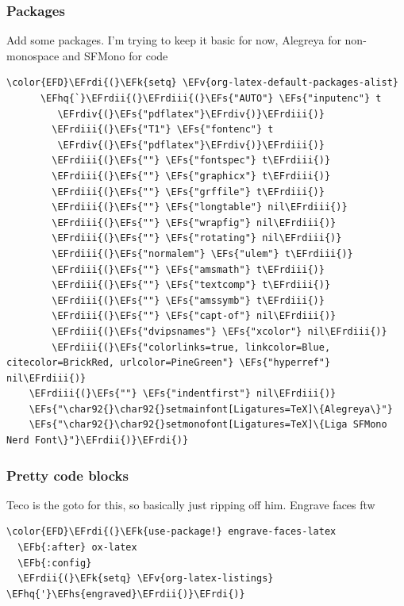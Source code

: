\documentclass{scrartcl}
\newcommand{\EFk}[1]{\textcolor{EFk}{#1}} %
\newcommand{\EFs}[1]{\textcolor{EFs}{#1}} %
\newcommand{\EFb}[1]{\textcolor{EFb}{#1}} %
\newcommand{\EFv}[1]{\textcolor{EFv}{#1}} %
\newcommand{\EFhq}[1]{\textcolor{EFhq}{#1}} %
\newcommand{\EFhs}[1]{\textcolor{EFhs}{#1}} %
\newcommand{\EFrdi}[1]{\textcolor{EFrdi}{#1}} %
\newcommand{\EFrdii}[1]{\textcolor{EFrdii}{#1}} %
\newcommand{\EFrdiii}[1]{\textcolor{EFrdiii}{#1}} %
\newcommand{\EFrdiv}[1]{\textcolor{EFrdiv}{#1}} %
\begin{document}
\subsubsection{Packages}
\label{sec:org042eed0}
Add some packages. I'm trying to keep it basic for now, Alegreya for
non-monospace and SFMono for code
\begin{Code}
\begin{Verbatim}[]
\color{EFD}\EFrdi{(}\EFk{setq} \EFv{org-latex-default-packages-alist}
      \EFhq{`}\EFrdii{(}\EFrdiii{(}\EFs{"AUTO"} \EFs{"inputenc"} t
         \EFrdiv{(}\EFs{"pdflatex"}\EFrdiv{)}\EFrdiii{)}
        \EFrdiii{(}\EFs{"T1"} \EFs{"fontenc"} t
         \EFrdiv{(}\EFs{"pdflatex"}\EFrdiv{)}\EFrdiii{)}
        \EFrdiii{(}\EFs{""} \EFs{"fontspec"} t\EFrdiii{)}
        \EFrdiii{(}\EFs{""} \EFs{"graphicx"} t\EFrdiii{)}
        \EFrdiii{(}\EFs{""} \EFs{"grffile"} t\EFrdiii{)}
        \EFrdiii{(}\EFs{""} \EFs{"longtable"} nil\EFrdiii{)}
        \EFrdiii{(}\EFs{""} \EFs{"wrapfig"} nil\EFrdiii{)}
        \EFrdiii{(}\EFs{""} \EFs{"rotating"} nil\EFrdiii{)}
        \EFrdiii{(}\EFs{"normalem"} \EFs{"ulem"} t\EFrdiii{)}
        \EFrdiii{(}\EFs{""} \EFs{"amsmath"} t\EFrdiii{)}
        \EFrdiii{(}\EFs{""} \EFs{"textcomp"} t\EFrdiii{)}
        \EFrdiii{(}\EFs{""} \EFs{"amssymb"} t\EFrdiii{)}
        \EFrdiii{(}\EFs{""} \EFs{"capt-of"} nil\EFrdiii{)}
        \EFrdiii{(}\EFs{"dvipsnames"} \EFs{"xcolor"} nil\EFrdiii{)}
        \EFrdiii{(}\EFs{"colorlinks=true, linkcolor=Blue, citecolor=BrickRed, urlcolor=PineGreen"} \EFs{"hyperref"} nil\EFrdiii{)}
    \EFrdiii{(}\EFs{""} \EFs{"indentfirst"} nil\EFrdiii{)}
    \EFs{"\char92{}\char92{}setmainfont[Ligatures=TeX]\{Alegreya\}"}
    \EFs{"\char92{}\char92{}setmonofont[Ligatures=TeX]\{Liga SFMono Nerd Font\}"}\EFrdii{)}\EFrdi{)}
\end{Verbatim}
\end{Code}

\subsubsection{Pretty code blocks}
\label{sec:org920ed78}
Teco is the goto for this, so basically just ripping off him. Engrave faces ftw
\begin{Code}
\begin{Verbatim}[]
\color{EFD}\EFrdi{(}\EFk{use-package!} engrave-faces-latex
  \EFb{:after} ox-latex
  \EFb{:config}
  \EFrdii{(}\EFk{setq} \EFv{org-latex-listings} \EFhq{'}\EFhs{engraved}\EFrdii{)}\EFrdi{)}
\end{Verbatim}
\end{Code}
\end{document}

